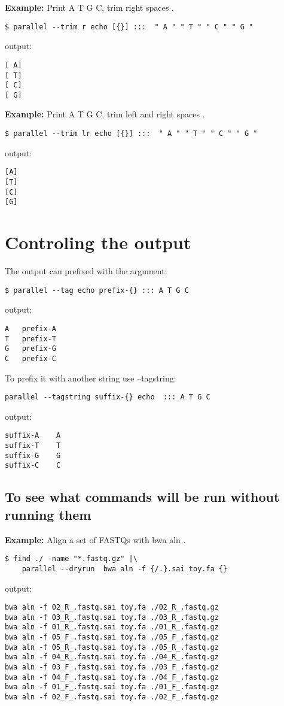 \documentclass{article}
\newcommand{\example}[1]{
\textbf{Example: } {\color[rgb]{0,0,1} #1 } .
}
\begin{document}
\example{Print A T G C, trim right spaces}
\begin{lstlisting}
$ parallel --trim r echo [{}] :::  " A " " T " " C " " G "
\end{lstlisting}
output:
\begin{lstlisting}
[ A]
[ T]
[ C]
[ G]
\end{lstlisting}
\example{Print A T G C, trim left and right spaces}
\begin{lstlisting}
$ parallel --trim lr echo [{}] :::  " A " " T " " C " " G "
\end{lstlisting}
output:
\begin{lstlisting}
[A]
[T]
[C]
[G]
\end{lstlisting}

\section{Controling the output}
The output can prefixed with the argument:
\begin{lstlisting}
$ parallel --tag echo prefix-{} ::: A T G C
\end{lstlisting}
output:
\begin{lstlisting}
A	prefix-A
T	prefix-T
G	prefix-G
C	prefix-C
\end{lstlisting}

To prefix it with another string use --tagstring:
\begin{lstlisting}
parallel --tagstring suffix-{} echo  ::: A T G C
\end{lstlisting}
output:
\begin{lstlisting}
suffix-A	A
suffix-T	T
suffix-G	G
suffix-C	C
\end{lstlisting}

\subsection{To see what commands will be run without running them}
\example{Align a set of FASTQs with bwa aln }
\begin{lstlisting}
$ find ./ -name "*.fastq.gz" |\
	parallel --dryrun  bwa aln -f {/.}.sai toy.fa {}
\end{lstlisting}
output:
\begin{lstlisting}
bwa aln -f 02_R_.fastq.sai toy.fa ./02_R_.fastq.gz
bwa aln -f 03_R_.fastq.sai toy.fa ./03_R_.fastq.gz
bwa aln -f 01_R_.fastq.sai toy.fa ./01_R_.fastq.gz
bwa aln -f 05_F_.fastq.sai toy.fa ./05_F_.fastq.gz
bwa aln -f 05_R_.fastq.sai toy.fa ./05_R_.fastq.gz
bwa aln -f 04_R_.fastq.sai toy.fa ./04_R_.fastq.gz
bwa aln -f 03_F_.fastq.sai toy.fa ./03_F_.fastq.gz
bwa aln -f 04_F_.fastq.sai toy.fa ./04_F_.fastq.gz
bwa aln -f 01_F_.fastq.sai toy.fa ./01_F_.fastq.gz
bwa aln -f 02_F_.fastq.sai toy.fa ./02_F_.fastq.gz
\end{lstlisting}
\end{document}
